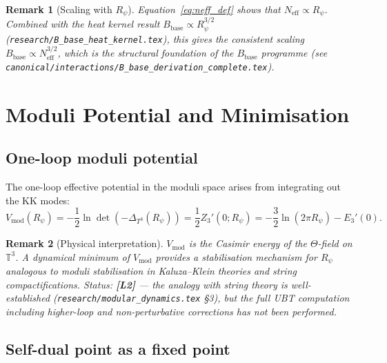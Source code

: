 \documentclass[11pt,a4paper]{article}
\newtheorem{remark}{Remark}
\newcommand{\Ltwo}{\textbf{[L2]}}
\begin{document}
\begin{remark}[Scaling with $R_\psi$]
  Equation~\eqref{eq:neff_def} shows that $N_{\mathrm{eff}}\propto R_\psi$.
  Combined with the heat kernel result $B_{\mathrm{base}}\propto R_\psi^{3/2}$
  (\texttt{research/B\_base\_heat\_kernel.tex}), this gives the consistent
  scaling $B_{\mathrm{base}}\propto N_{\mathrm{eff}}^{3/2}$,
  which is the structural foundation of the $B_{\mathrm{base}}$ programme
  (see \texttt{canonical/interactions/B\_base\_derivation\_complete.tex}).
\end{remark}

\section{Moduli Potential and Minimisation}
\label{sec:moduli}

\subsection{One-loop moduli potential}

The one-loop effective potential in the moduli space arises from integrating
out the KK modes:
\begin{equation}
\label{eq:moduli_potential}
  V_{\mathrm{mod}}(R_\psi)
  = -\frac{1}{2}\ln\det(-\Delta_{T^3}(R_\psi))
  = \frac{1}{2}Z_3'(0;R_\psi)
  = -\frac{3}{2}\ln(2\pi R_\psi) - E_3'(0).
\end{equation}

\begin{remark}[Physical interpretation]
  $V_{\mathrm{mod}}$ is the Casimir energy of the $\Theta$-field on $\mathbb{T}^3$.
  A dynamical minimum of $V_{\mathrm{mod}}$ provides a stabilisation mechanism
  for $R_\psi$ analogous to moduli stabilisation in Kaluza--Klein theories
  and string compactifications.
  Status: \Ltwo{} — the analogy with string theory is well-established
  (\texttt{research/modular\_dynamics.tex} §3), but the full UBT computation
  including higher-loop and non-perturbative corrections has not been performed.
\end{remark}

\subsection{Self-dual point as a fixed point}
\end{document}
